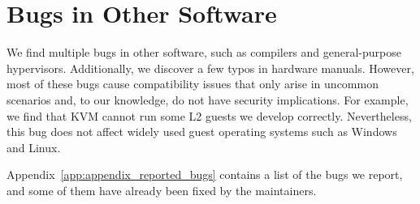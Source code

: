 \section{Bugs in Other Software}
\label{sec:discussion_bugs_in_related_software}

We find multiple bugs in other software, such as compilers and general-purpose hypervisors. Additionally, we discover a few typos in hardware manuals. However, most of these bugs cause compatibility issues that only arise in uncommon scenarios and, to our knowledge, do not have security implications. For example, we find that KVM cannot run some L2 guests we develop correctly. Nevertheless, this bug does not affect widely used guest operating systems such as Windows and Linux.

Appendix~\ref{app:appendix_reported_bugs} contains a list of the bugs we report, and some of them have already been fixed by the maintainers.

